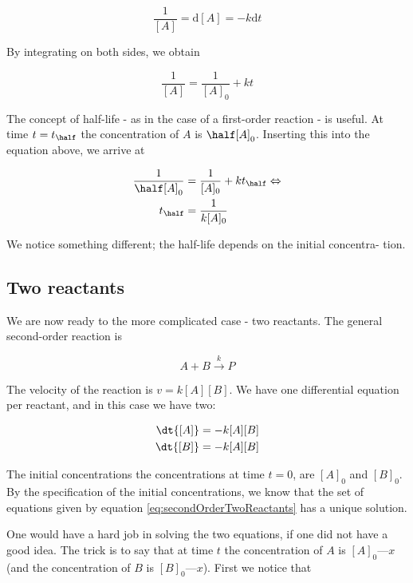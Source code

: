 \begin{equation}
  \frac{1}{[A]} = \mathrm{d}[A] = -k\mathrm{d}t
\end{equation}

By integrating on both sides, we obtain

\begin{equation}
  \frac{1}{[A]} = \frac{1}{[A]_0} + kt
\end{equation}

The concept of half-life - as in the case of a first-order reaction - is useful. At time $t = t_{\half}$ the concentration of $A$ is $\half[A]_0$. Inserting this into the equation above, we arrive at

\begin{align}
  \frac{1}{\half[A]_0} &= \frac{1}{[A]_0} + kt_{\half} \Leftrightarrow \nonumber  \\
  t_{\half} &= \frac{1}{k[A]_0}
\end{align}

We notice something different; the half-life depends on the initial concentra- tion.

\subsection{Two reactants}

We are now ready to the more complicated case - two reactants. The general second-order reaction is

\begin{equation}
  \label{eq:secondOrder}
  A + B \overset{k}{\rightarrow} P
\end{equation}

The velocity of the reaction is $v = k[A][B]$. We have one differential equation per reactant, and in this case we have two:

\begin{subequations}
  \label{eq:secondOrderTwoReactants}
\begin{align}
  \dt{[A]} &= -k[A][B] \\
  \dt{[B]} &= -k[A][B]
\end{align}
\end{subequations}

The initial concentrations \ie the concentrations at time $t = 0$, are $[A]_0$ and $[B]_0$. By the specification of the initial concentrations, we know that the set of equations given by equation \ref{eq:secondOrderTwoReactants} has a unique solution.

One would have a hard job in solving the two equations, if one did not have a good idea. The trick is to say that at time $t$ the concentration of $A$ is $[A]_0 — x$ (and the concentration of $B$ is $[B]_0 — x$). First we notice that

